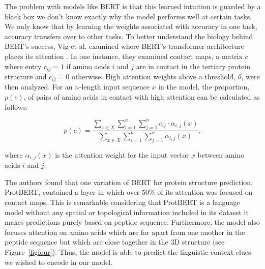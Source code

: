 \documentclass{SBCbookchapter}
\begin{document}
The problem with models like BERT is that this learned intuition is guarded by a black box \textemdash we don't know exactly why the model performs well at certain tasks. We only know that by learning 
the weights associated with accuracy in one task, accuracy transfers over to other tasks. To better understand the biology behind BERT's success, Vig et al. examined where BERT's transformer 
architecture places its attention \cite{vig_bertology_2020}. In one instance, they examined contact maps, a matrix $c$ where entry $c_{ij} = 1$ if amino acids $i$ and $j$ are in contact in the tertiary 
protein structure and $c_{ij} = 0$ otherwise. High attention weights above a threshold, $\theta$, were then analyzed. For an $n$-length input sequence $x$ in the model, the proportion, $p(c)$, of pairs 
of amino acids in contact with high attention can be calculated as follows:

\begin{equation*}
    p(c) = \frac{\sum\limits_{x \in X} \sum\limits_{i = 1}^{n} \sum\limits_{j = 1}^n c_{ij} \cdot \alpha_{i,j}(x)}{{\sum\limits_{x \in X} \sum\limits_{i = 1}^{n} \sum\limits_{j = 1}^n \alpha_{i,j}(x)}} 
,
\end{equation*}

where $\alpha_{i,j}(x)$ is the attention weight for the input vector $x$ between amino acids $i$ and $j$. 

The authors found that one variation of BERT for protein structure prediction, ProtBERT, contained a layer in which over 50\% of its attention was focused on contact maps. This is remarkable considering 
that ProtBERT is a language model without any spatial or topological information included in its dataset \textemdash it makes predictions purely based on peptide sequence. Furthermore, the model also 
focuses attention on amino acids which are far apart from one another in the peptide sequence but which are close together in the 3D structure (see Figure~\ref{figfour}). Thus, the model is able to 
predict the linguistic context clues we wished to encode in our model. 
\end{document}
